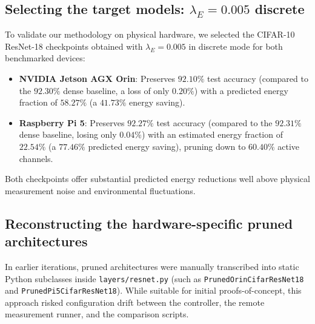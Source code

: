 \subsection{Selecting the target models: \texorpdfstring{$\lambda_E = 0.005$}{lambda = 0.005} discrete}

To validate our methodology on physical hardware, we selected the CIFAR-10 ResNet-18 checkpoints obtained with $\lambda_E = 0.005$ in discrete mode for both benchmarked devices:
\begin{itemize}
    \item \textbf{NVIDIA Jetson AGX Orin}: Preserves $92.10\%$ test accuracy (compared to the $92.30\%$ dense baseline, a loss of only $0.20\%$) with a predicted energy fraction of $58.27\%$ (a $41.73\%$ energy saving).
    \item \textbf{Raspberry Pi 5}: Preserves $92.27\%$ test accuracy (compared to the $92.31\%$ dense baseline, losing only $0.04\%$) with an estimated energy fraction of $22.54\%$ (a $77.46\%$ predicted energy saving), pruning down to $60.40\%$ active channels.
\end{itemize}
Both checkpoints offer substantial predicted energy reductions well above physical measurement noise and environmental fluctuations.

\subsection{Reconstructing the hardware-specific pruned architectures}

In earlier iterations, pruned architectures were manually transcribed into static Python subclasses inside \texttt{layers/resnet.py} (such as \texttt{PrunedOrin\-Cifar\-ResNet18} and \texttt{PrunedPi5\-Cifar\-ResNet18}). While suitable for initial proofs-of-concept, this approach risked configuration drift between the controller, the remote measurement runner, and the comparison scripts.

